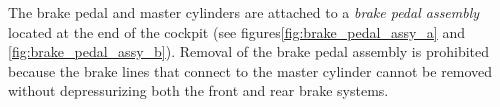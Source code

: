 The brake pedal and master cylinders are attached to a \emph{brake pedal assembly} located at the end of the cockpit (see figures\ref{fig:brake_pedal_assy_a} and \ref{fig:brake_pedal_assy_b}). Removal of the brake pedal assembly is prohibited because the brake lines that connect to the master cylinder cannot be removed without depressurizing both the front and rear brake systems. 

\begin{figure}[h!]
	\centering
\end{figure}
